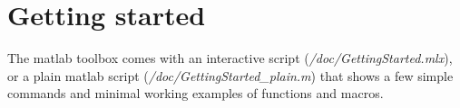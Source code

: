 \section{Getting started}
The matlab toolbox comes with an interactive script (\textit{/doc/GettingStarted.mlx}), or a plain matlab script (\textit{/doc/GettingStarted\_plain.m}) that shows a few simple commands and minimal working examples of functions and macros. 


